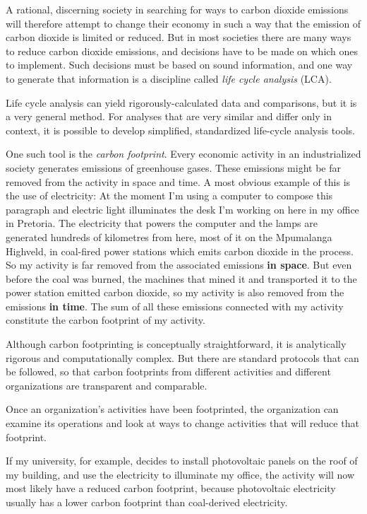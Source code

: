 A rational, discerning society in searching for ways to carbon dioxide
emissions will therefore attempt to change their economy in such a way that the
emission of carbon dioxide is limited or reduced. But in most societies there
are many ways to reduce carbon dioxide emissions, and decisions have to be
made on which ones to implement. Such decisions must be based on sound information,
and one way to generate that information is a discipline called \textit{life
cycle analysis} (LCA). 

Life cycle analysis can yield rigorously-calculated data and comparisons, but it
is a very general method. For analyses that are very similar and differ only in
context, it is possible to develop simplified, standardized life-cycle analysis tools.

One such tool is the \textit{carbon footprint}. Every economic activity in an
industrialized society generates emissions of greenhouse gases.
These emissions might  be far removed from the activity in space and time. A
most obvious example of this is the use of electricity: At the moment I'm using
a computer to compose this paragraph and electric light illuminates the desk I'm
working on here in my office in Pretoria. The electricity that powers the
computer and the lamps are generated hundreds of kilometres from here, most of
it on the Mpumalanga Highveld, in coal-fired power stations which emits carbon
dioxide in the process. So my activity is far removed from the associated
emissions \textbf{in space}. But even before the coal was burned, the machines that mined
it and transported it to the power station emitted carbon dioxide, so my
activity is also removed from the emissions \textbf{in time}. The sum of all these
emissions connected with my activity constitute the carbon footprint of my
activity.

Although carbon footprinting is conceptually straightforward, it is analytically
rigorous and computationally complex. But there are standard protocols
\autocite{WRI2004} that can be followed, so that carbon footprints from
different activities and different organizations are transparent and comparable.

Once an organization's activities have been footprinted, the organization can
examine its operations and look at ways to change activities that will reduce
that footprint.

If my university, for example, decides to install photovoltaic panels on the roof
of my building, and use the electricity to illuminate my office, the activity
will now most likely have a reduced carbon footprint, because photovoltaic
electricity usually has a lower carbon footprint than coal-derived electricity.

